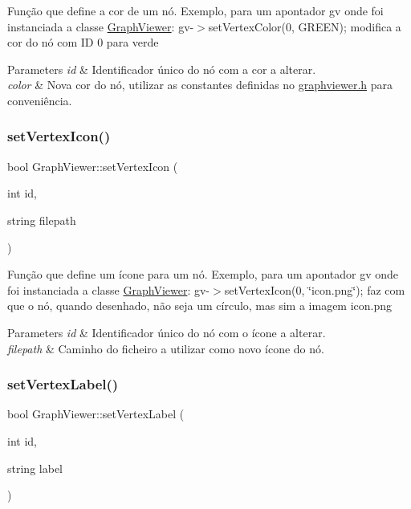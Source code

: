 Função que define a cor de um nó. Exemplo, para um apontador gv onde foi instanciada a classe \hyperlink{class_graph_viewer}{Graph\+Viewer}\+: gv-\/$>$set\+Vertex\+Color(0, G\+R\+E\+E\+N); modifica a cor do nó com ID 0 para verde


\begin{DoxyParams}{Parameters}
{\em id} & Identificador único do nó com a cor a alterar. \\
\hline
{\em color} & Nova cor do nó, utilizar as constantes definidas no \hyperlink{graphviewer_8h_source}{graphviewer.\+h} para conveniência. \\
\hline
\end{DoxyParams}
\mbox{\label{class_graph_viewer_a02d5f7393eab9a2d1b66719039597a64}} 
\subsubsection{\texorpdfstring{set\+Vertex\+Icon()}{setVertexIcon()}}
{\footnotesize\ttfamily bool Graph\+Viewer\+::set\+Vertex\+Icon (\begin{DoxyParamCaption}\item[{int}]{id,  }\item[{string}]{filepath }\end{DoxyParamCaption})}

Função que define um ícone para um nó. Exemplo, para um apontador gv onde foi instanciada a classe \hyperlink{class_graph_viewer}{Graph\+Viewer}\+: gv-\/$>$set\+Vertex\+Icon(0, \char`\"{}icon.\+png\char`\"{}); faz com que o nó, quando desenhado, não seja um círculo, mas sim a imagem icon.\+png


\begin{DoxyParams}{Parameters}
{\em id} & Identificador único do nó com o ícone a alterar. \\
\hline
{\em filepath} & Caminho do ficheiro a utilizar como novo ícone do nó. \\
\hline
\end{DoxyParams}
\mbox{\label{class_graph_viewer_ac25d7d007022fda16799808ba136e909}} 
\subsubsection{\texorpdfstring{set\+Vertex\+Label()}{setVertexLabel()}}
{\footnotesize\ttfamily bool Graph\+Viewer\+::set\+Vertex\+Label (\begin{DoxyParamCaption}\item[{int}]{id,  }\item[{string}]{label }\end{DoxyParamCaption})}

